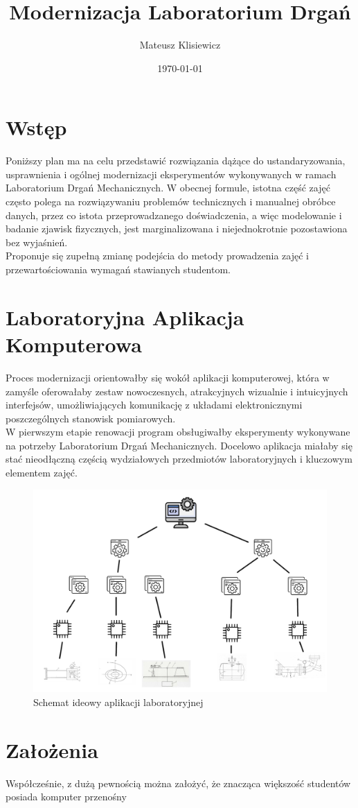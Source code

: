 \documentclass[12pt]{article}
\title{Modernizacja Laboratorium Drgań}
\author{Mateusz Klisiewicz}
\date{\today}
\title{\mytitle \\
  \large \mysubtitle}
\begin{document}
\maketitle
\newpage
\section*{Wstęp}
Poniższy plan ma na celu przedstawić rozwiązania dążące do ustandaryzowania, usprawnienia i ogólnej modernizacji eksperymentów wykonywanych w ramach Laboratorium Drgań Mechanicznych. W obecnej formule, istotna część zajęć często polega na rozwiązywaniu problemów technicznych i manualnej obróbce danych, przez co istota przeprowadzanego doświadczenia, a więc modelowanie i badanie zjawisk fizycznych, jest marginalizowana i niejednokrotnie pozostawiona bez wyjaśnień. \\Proponuje się zupełną zmianę podejścia do metody prowadzenia zajęć i przewartościowania wymagań stawianych studentom.
\section*{Laboratoryjna Aplikacja Komputerowa}
Proces modernizacji orientowałby się wokół aplikacji komputerowej, która w zamyśle oferowałaby zestaw nowoczesnych, atrakcyjnych wizualnie i intuicyjnych interfejsów, umożliwiających komunikację z układami elektronicznymi poszczególnych stanowisk pomiarowych.\\ W pierwszym etapie renowacji program obsługiwałby eksperymenty wykonywane na potrzeby Laboratorium Drgań Mechanicznych. Docelowo aplikacja miałaby się stać nieodłączną częścią wydziałowych przedmiotów laboratoryjnych i kluczowym elementem zajęć. 
\begin{figure}[h]
\centering
\includegraphics[width=14cm]{app_sch}
\caption{Schemat ideowy aplikacji laboratoryjnej}
\end{figure}
\newpage
\section*{Założenia}
Współcześnie, z dużą pewnością można założyć, że znacząca większość studentów posiada komputer przenośny
\end{document}
